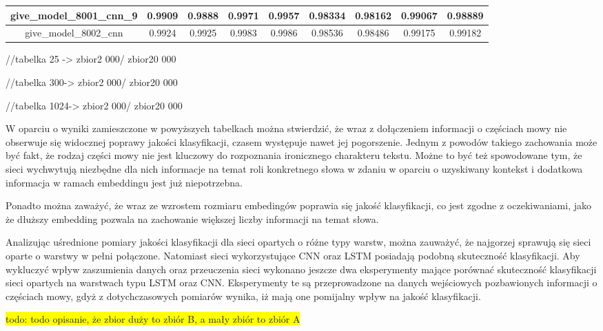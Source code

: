 \begin{table}[!h]
\begin{tabular} {|c|c|c|c|c|c|c|c|c| }
        give\_model\_8001\_cnn\_9         & 0.9909                        & 0.9888                         & 0.9971                      & 0.9957                  & 0.98334 & 0.98162 & 0.99067 & 0.98889 \\ \hline
        give\_model\_8002\_cnn            & 0.9924                        & 0.9925                         & 0.9983                      & 0.9986                  & 0.98536 & 0.98486 & 0.99175 & 0.99182 \\ \hline
    \end{tabular}
\end{table}




//tabelka 25 -> zbior2 000/ zbior20 000

//tabelka 300-> zbior2 000/ zbior20 000

//tabelka 1024-> zbior2 000/ zbior20 000

W oparciu o wyniki zamieszczone w powyższych tabelkach można stwierdzić, że wraz z dołączeniem informacji o częściach mowy nie obserwuje się widocznej poprawy jakości klasyfikacji, czasem występuje nawet jej pogorszenie. Jednym z powodów takiego zachowania może być fakt, że rodzaj części mowy nie jest kluczowy do rozpoznania ironicznego charakteru tekstu. Możne to być też spowodowane tym, że sieci wychwytują niezbędne dla nich informacje na temat roli konkretnego słowa w zdaniu w oparciu o uzyskiwany kontekst i dodatkowa informacja w ramach embeddingu jest już niepotrzebna.

Ponadto można zaważyć, że wraz ze wzrostem rozmiaru embedingów poprawia się jakość klasyfikacji, co jest zgodne z oczekiwaniami, jako że dłuższy embedding pozwala na zachowanie większej liczby informacji na temat słowa.


Analizując uśrednione pomiary jakości klasyfikacji dla sieci opartych o różne typy warstw, można zauważyć, że najgorzej sprawują się sieci oparte o warstwy w pełni połączone. Natomiast sieci wykorzystujące CNN oraz LSTM posiadają podobną skuteczność klasyfikacji. Aby wykluczyć wpływ zaszumienia danych oraz przeuczenia sieci wykonano jeszcze dwa eksperymenty mające porównać skuteczność klasyfikacji sieci opartych na warstwach typu LSTM oraz CNN. Eksperymenty te są przeprowadzone na danych wejściowych pozbawionych informacji o częściach mowy, gdyż z dotychczasowych pomiarów wynika, iż mają one pomijalny wpływ na jakość klasyfikacji.

\colorbox{yellow}{todo: todo opisanie, że zbior duży to zbiór B, a mały zbiór to zbiór A}\\
